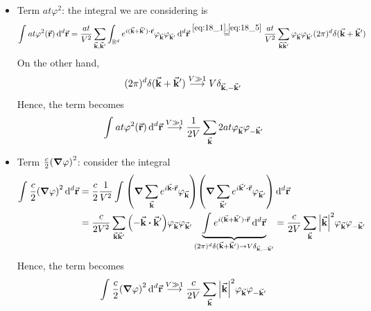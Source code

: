 \documentclass[../../Main/Main.tex]{subfiles}
\begin{document}
\begin{itemize}
\item Term \( a t \varphi ^2 \): the integral we are considering is
\begin{equation*}
  \int_{}^{}  a t \varphi ^2 (\va{r}) \dd[d]{\va{r}}= \frac{a t}{V^2} \sum_{\va{k},\va{k}'}^{}  \int_{\R^d}^{} e^{i (\va{k}+\va{k}') \vdot \va{r}} \varphi _{\va{k}} \varphi _{\va{k}'} \dd[d]{\va{r}}
  \overset{\eqref{eq:18_1},\eqref{eq:18_5}}{=}  \frac{at}{V^2} \sum_{\va{k}\va{k}'}^{} \varphi _{\va{k}} \varphi _{\va{k}'} (2 \pi )^d \delta (\va{k}+\va{k}')
\end{equation*}
On the other hand,
\begin{equation*}
  (2 \pi )^d \delta (\va{k}+ \va{k}') \overset{V \gg 1 }{\longrightarrow} V \delta _{\va{k},-\va{k}'}
\end{equation*}
Hence, the term becomes
\begin{equation}
   \int_{}^{}  a t \varphi ^2 (\va{r}) \dd[d]{\va{r}} \overset{V \gg 1 }{\longrightarrow} \frac{1}{2V} \sum_{\va{k}}^{} 2 a t  \varphi _{\va{k}} \varphi _{-\va{k}'}
   \label{eq:18_6}
\end{equation}



\item Term \( \frac{c}{2} \qty(\grad \varphi )^2    \): consider the integral
\begin{equation*}
\begin{split}
  \int_{}^{}  \frac{c}{2} \qty(\grad \varphi )^2 \dd[d]{\va{r}} & =
  \frac{c}{2} \frac{1}{V^2} \int_{}^{} \qty(\grad \sum_{\va{k}}^{} e^{i \va{k} \vdot \va{r}} \varphi _{\va{k}}  ) \qty(\grad \sum_{\va{k}'}^{} e^{i \va{k}' \vdot \va{r} } \varphi _{\va{k}'}  )  \dd[d]{\va{r}}    \\
  & = \frac{c}{2 V^2} \sum_{\va{k} \va{k}'}^{}  \qty( - \va{k} \vdot \va{k}') \varphi _{\va{k}} \varphi _{\va{k}'} \underbrace{ \int_{}^{}  e^{i (\va{k}+\va{k}')\vdot \va{r}} \dd[d]{\va{r}}   }_{(2 \pi )^d \delta (\va{k}+ \va{k}') \rightarrow V \delta _{\va{k},-\va{k}'} }
   = \frac{c}{2V} \sum_{\va{k}}^{} \abs{\va{k}}^2 \varphi _{\va{k}} \varphi _{-\va{k}'}
\end{split}
\end{equation*}
Hence, the term becomes
\begin{equation}
  \int_{}^{}  \frac{c}{2} \qty(\grad \varphi )^2 \dd[d]{\va{r}}
\overset{V \gg 1 }{\longrightarrow}
   \frac{c}{2V} \sum_{\va{k}}^{} \abs{\va{k}}^2 \varphi _{\va{k}} \varphi _{-\va{k}'}
   \label{eq:18_7}
\end{equation}

\end{itemize}
\end{document}
